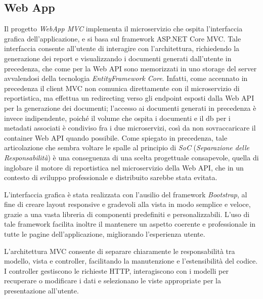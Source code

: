 \subsection{Web App}
Il progetto \emph{WebApp MVC} implementa il microservizio che ospita l'interfaccia grafica dell'applicazione, e si basa sul framework ASP.NET Core MVC. Tale interfaccia consente all'utente di interagire con l'architettura, richiedendo la generazione dei report e visualizzando i documenti generati dall'utente in precedenza, che come per la Web API sono memorizzati in uno storage del server avvalendosi della tecnologia \emph{EntityFramework Core}. Infatti, come accennato in precedenza il client MVC non comunica direttamente con il microservizio di reportistica, ma effettua un redirecting verso gli endpoint esposti dalla Web API per la generazione dei documenti; l'accesso ai documenti generati in precedenza è invece indipendente, poiché il volume che ospita i documenti e il db per i metadati associati è condiviso fra i due microservizi, così da non sovraccaricare il container Web API quando possibile. Come spiegato in precedenza, tale articolazione che sembra voltare le spalle al principio di \emph{SoC} (\emph{Separazione delle Responsabilità}) è una conseguenza di una scelta progettuale consapevole, quella di inglobare il motore di reportistica nel microservizio della Web API, che in un contesto di sviluppo professionale e distribuito sarebbe stata evitata.

L'interfaccia grafica è stata realizzata con l'ausilio del framework \emph{Bootstrap}, al fine di creare layout responsive e gradevoli alla vista in modo semplice e veloce, grazie a una vasta libreria di componenti predefiniti e personalizzabili. L'uso di tale framework facilita inoltre il mantenere un aspetto coerente e professionale in tutte le pagine dell'applicazione, migliorando l'esperienza utente.

L'architettura MVC consente di separare chiaramente le responsabilità tra modello, vista e controller, facilitando la manutenzione e l'estensibilità del codice. I controller gestiscono le richieste HTTP, interagiscono con i modelli per recuperare o modificare i dati e selezionano le viste appropriate per la presentazione all'utente.

